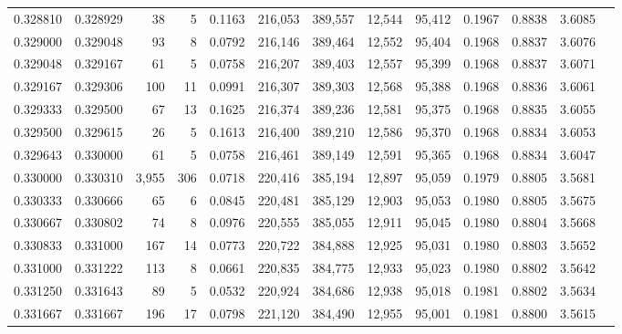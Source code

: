 \begin{tabular}{rrrrrrrrrrrrr}
0.328810 & 0.328929 &    38 &   5 &                                     0.1163 & 216,053 & 389,557 &  12,544 &  95,412 & 0.1967 & 0.8838 & 3.6085 \\
0.329000 & 0.329048 &    93 &   8 &                                     0.0792 & 216,146 & 389,464 &  12,552 &  95,404 & 0.1968 & 0.8837 & 3.6076 \\
0.329048 & 0.329167 &    61 &   5 &                                     0.0758 & 216,207 & 389,403 &  12,557 &  95,399 & 0.1968 & 0.8837 & 3.6071 \\
0.329167 & 0.329306 &   100 &  11 &                                     0.0991 & 216,307 & 389,303 &  12,568 &  95,388 & 0.1968 & 0.8836 & 3.6061 \\
0.329333 & 0.329500 &    67 &  13 &                                     0.1625 & 216,374 & 389,236 &  12,581 &  95,375 & 0.1968 & 0.8835 & 3.6055 \\
0.329500 & 0.329615 &    26 &   5 &                                     0.1613 & 216,400 & 389,210 &  12,586 &  95,370 & 0.1968 & 0.8834 & 3.6053 \\
0.329643 & 0.330000 &    61 &   5 &                                     0.0758 & 216,461 & 389,149 &  12,591 &  95,365 & 0.1968 & 0.8834 & 3.6047 \\
0.330000 & 0.330310 & 3,955 & 306 &                                     0.0718 & 220,416 & 385,194 &  12,897 &  95,059 & 0.1979 & 0.8805 & 3.5681 \\
0.330333 & 0.330666 &    65 &   6 &                                     0.0845 & 220,481 & 385,129 &  12,903 &  95,053 & 0.1980 & 0.8805 & 3.5675 \\
0.330667 & 0.330802 &    74 &   8 &                                     0.0976 & 220,555 & 385,055 &  12,911 &  95,045 & 0.1980 & 0.8804 & 3.5668 \\
0.330833 & 0.331000 &   167 &  14 &                                     0.0773 & 220,722 & 384,888 &  12,925 &  95,031 & 0.1980 & 0.8803 & 3.5652 \\
0.331000 & 0.331222 &   113 &   8 &                                     0.0661 & 220,835 & 384,775 &  12,933 &  95,023 & 0.1980 & 0.8802 & 3.5642 \\
0.331250 & 0.331643 &    89 &   5 &                                     0.0532 & 220,924 & 384,686 &  12,938 &  95,018 & 0.1981 & 0.8802 & 3.5634 \\
0.331667 & 0.331667 &   196 &  17 &                                     0.0798 & 221,120 & 384,490 &  12,955 &  95,001 & 0.1981 & 0.8800 & 3.5615 \\

\end{tabular}
